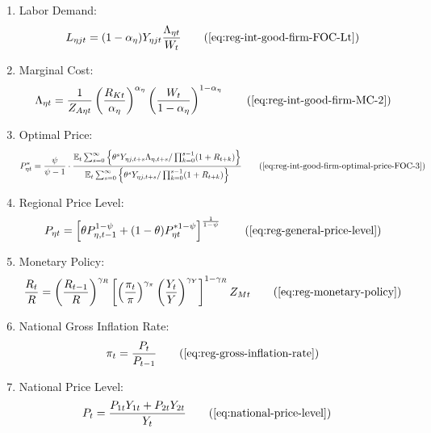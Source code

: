 \documentclass[../thesis.tex]{subfiles}
\begin{document}
{\begin{itemize}
\begin{enumerate}
		\item Labor Demand:
		\begin{align}
			L_{\eta jt} = (1-{\alpha_{\eta}}) Y_{\eta jt} \frac{\Lambda_{\eta t}}{W_t} \tag{\ref{eq:reg-int-good-firm-FOC-Lt}}
		\end{align}
		
		\item Marginal Cost:
		\begin{align}
			\Lambda_{\eta t} = \frac{1}{Z_{A\eta t}} \left( \frac{R_{Kt}}{{\alpha_{\eta}}} \right)^{{\alpha_{\eta}}} \left( \frac{W_t}{1-{\alpha_{\eta}}} \right)^{1-{\alpha_{\eta}}} \tag{\ref{eq:reg-int-good-firm-MC-2}}
		\end{align}
		
		\item Optimal Price:
		\begin{align}
			P_{\eta t}^{\ast} = \frac{\psi}{\psi-1} \cdot \frac{ \E \sum_{s=0}^{\infty} \left\{ \theta^s Y_{\eta j,t+s} \Lambda_{\eta, t+s} / \prod_{k=0}^{s-1}(1+R_{t+k}) \right\}} {\E \sum_{s=0}^{\infty} \left\{ \theta^s Y_{\eta j,t+s} / \prod_{k=0}^{s-1}(1 + R_{t+k}) \right\}} \tag{\ref{eq:reg-int-good-firm-optimal-price-FOC-3}}
		\end{align}
		
		\item Regional Price Level:
		\begin{align}
			P_{\eta t} = \left[ \theta P_{\eta,t-1}^{1-\psi} + (1-\theta) P_{\eta t}^{\ast 1-\psi} \right]^\frac{1}{1-\psi} \tag{\ref{eq:reg-general-price-level}}
		\end{align}
		
		\item Monetary Policy:
		\begin{align}
			\frac{R_{t}}{R} = \left( \frac{R_{t-1}}{R} \right)^{\gamma_R} \left[ \left( \frac{\pi_t}{\pi} \right)^{\gamma_\pi} \left( \frac{Y_{t}}{Y} \right)^{\gamma_Y} \right]^{1-\gamma_R} Z_{Mt} \tag{\ref{eq:reg-monetary-policy}}
		\end{align}
		
		\item National Gross Inflation Rate:
		\begin{align}
			\pi_t = \frac{P_t}{P_{t-1}} \tag{\ref{eq:reg-gross-inflation-rate}}
		\end{align}
		
		\item National Price Level:
		\begin{align}
			P_{t} &= \frac{P_{1t} Y_{1t} + P_{2t} Y_{2t}}{Y_{t}} \tag{\ref{eq:national-price-level}} %
		\end{align}
		

\end{enumerate}
\end{itemize}}
\end{document}
